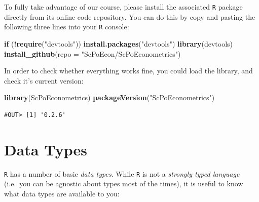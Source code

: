 \documentclass[]{book}
\newenvironment{Shaded}{\begin{snugshade}}{\end{snugshade}}
\newcommand{\KeywordTok}[1]{\textcolor[rgb]{0.13,0.29,0.53}{\textbf{#1}}}
\newcommand{\DataTypeTok}[1]{\textcolor[rgb]{0.13,0.29,0.53}{#1}}
\newcommand{\StringTok}[1]{\textcolor[rgb]{0.31,0.60,0.02}{#1}}
\newcommand{\ControlFlowTok}[1]{\textcolor[rgb]{0.13,0.29,0.53}{\textbf{#1}}}
\newcommand{\OperatorTok}[1]{\textcolor[rgb]{0.81,0.36,0.00}{\textbf{#1}}}
\newcommand{\NormalTok}[1]{#1}
\begin{document}
To fully take advantage of our course, please install the associated
\texttt{R} package directly from its online code repository. You can do
this by copy and pasting the following three lines into your \texttt{R}
console:

\begin{Shaded}
\begin{Highlighting}[]
\ControlFlowTok{if}\NormalTok{ (}\OperatorTok{!}\KeywordTok{require}\NormalTok{(}\StringTok{"devtools"}\NormalTok{)) }\KeywordTok{install.packages}\NormalTok{(}\StringTok{"devtools"}\NormalTok{)}
\KeywordTok{library}\NormalTok{(devtools)}
\KeywordTok{install_github}\NormalTok{(}\DataTypeTok{repo =} \StringTok{"ScPoEcon/ScPoEconometrics"}\NormalTok{)}
\end{Highlighting}
\end{Shaded}

In order to check whether everything works fine, you could load the
library, and check it's current version:

\begin{Shaded}
\begin{Highlighting}[]
\KeywordTok{library}\NormalTok{(ScPoEconometrics)}
\KeywordTok{packageVersion}\NormalTok{(}\StringTok{"ScPoEconometrics"}\NormalTok{)}
\end{Highlighting}
\end{Shaded}

\begin{verbatim}
#OUT> [1] '0.2.6'
\end{verbatim}

\section{Data Types}\label{data-types}

\texttt{R} has a number of basic \emph{data types}. While \texttt{R} is
not a \emph{strongly typed language} (i.e.~you can be agnostic about
types most of the times), it is useful to know what data types are
available to you:
\end{document}
